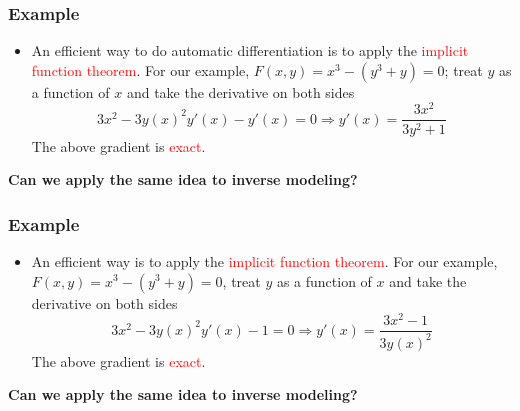 \documentclass[usenames,dvipsnames]{beamer}
\begin{document}
\begin{frame}
	\frametitle{Example}

	\begin{itemize}
		\item An efficient way to do automatic differentiation is to apply the \textcolor{red}{implicit function theorem}. For our example, $F(x,y)=x^3-(y^3+y)=0$; treat $y$ as a function of $x$ and take the derivative on both sides
		      $$3x^2 - 3y(x)^2y'(x)-y'(x)=0\Rightarrow y'(x) = \frac{3x^2}{3y^2+1}$$
		      The above gradient is \textcolor{red}{exact}.
	\end{itemize}
	\begin{center}
		\textbf{Can we apply the same idea to inverse modeling?}
	\end{center}

\end{frame}

\begin{frame}
	\frametitle{Example}
	
	\begin{itemize}
		\item An efficient way is to apply the \textcolor{red}{implicit function theorem}. For our example, $F(x,y)=x^3-(y^3+y)=0$, treat $y$ as a function of $x$ and take the derivative on both sides
		$$3x^2 - 3y(x)^2y'(x)-1=0\Rightarrow y'(x) = \frac{3x^2-1}{3y(x)^2}$$
	The above gradient is \textcolor{red}{exact}.
	\end{itemize}
	\begin{center}
			\textbf{Can we apply the same idea to inverse modeling?}
	\end{center}

\end{frame}
\end{document}
